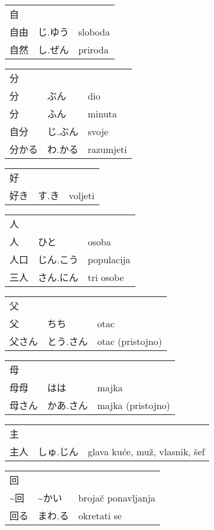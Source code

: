 

\newenvironment{dictentry}[1]{
	\begin{tabular}{p{2cm} p{3cm} p{10cm}}
		#1 &&\\
}{
	\end{tabular}
	\vspace{20pt}
}

\newcommand{\example}[3]{
	\hspace*{\fill}#1 & #2 & #3\\
}

\author{ロボット君}


\begin{dictentry}{自}
\example{自由}{じ.ゆう}{sloboda}
\example{自然}{し.ぜん}{priroda}
\end{dictentry}

\begin{dictentry}{分}
\example{分}{ぶん}{dio}
\example{分}{ふん}{minuta}
\example{自分}{じ.ぶん}{svoje}
\example{分かる}{わ.かる}{razumjeti}
\end{dictentry}

\begin{dictentry}{好}
\example{好き}{す.き}{voljeti}
\end{dictentry}

\begin{dictentry}{人}
\example{人}{ひと}{osoba}
\example{人口}{じん.こう}{populacija}
\example{三人}{さん.にん}{tri osobe}
\end{dictentry}

\begin{dictentry}{父}
\example{父}{ちち}{otac}
\example{父さん}{とう.さん}{otac (pristojno)}
\end{dictentry}

\begin{dictentry}{母}
\example{母母}{はは}{majka}
\example{母さん}{かあ.さん}{majka (pristojno)}
\end{dictentry}

\begin{dictentry}{主}
\example{主人}{しゅ.じん}{glava kuće, muž, vlasnik, šef}
\end{dictentry}

\begin{dictentry}{回}
\example{\textasciitilde 回}{\textasciitilde かい}{brojač ponavljanja}
\example{回る}{まわ.る}{okretati se}
\end{dictentry}

